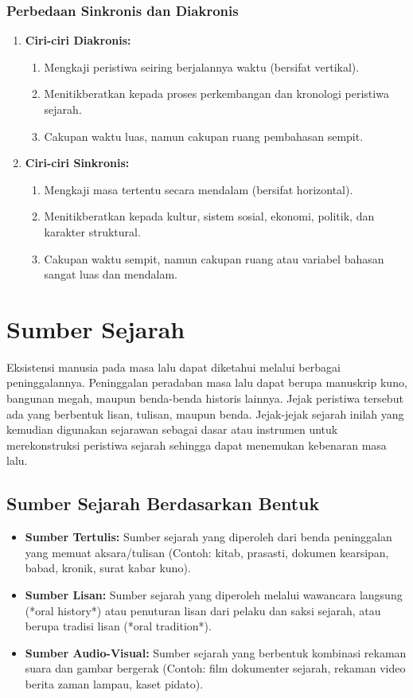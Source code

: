 \documentclass[12pt, a4paper]{article}
\begin{document}
\subsubsection{Perbedaan Sinkronis dan Diakronis} 
\begin{enumerate}
	\item \textbf{Ciri-ciri Diakronis:}
		\begin{enumerate}
			\item Mengkaji peristiwa seiring berjalannya waktu (bersifat vertikal).
			\item Menitikberatkan kepada proses perkembangan dan kronologi peristiwa sejarah.
			\item Cakupan waktu luas, namun cakupan ruang pembahasan sempit.
		\end{enumerate}
	\item \textbf{Ciri-ciri Sinkronis:}
		\begin{enumerate}
			\item Mengkaji masa tertentu secara mendalam (bersifat horizontal).
			\item Menitikberatkan kepada kultur, sistem sosial, ekonomi, politik, dan karakter struktural.
			\item Cakupan waktu sempit, namun cakupan ruang atau variabel bahasan sangat luas dan mendalam.
		\end{enumerate}
\end{enumerate}

\section{Sumber Sejarah}
Eksistensi manusia pada masa lalu dapat diketahui melalui berbagai peninggalannya. Peninggalan peradaban masa lalu dapat berupa manuskrip kuno, bangunan megah, maupun benda-benda historis lainnya. Jejak peristiwa tersebut ada yang berbentuk lisan, tulisan, maupun benda. Jejak-jejak sejarah inilah yang kemudian digunakan sejarawan sebagai dasar atau instrumen untuk merekonstruksi peristiwa sejarah sehingga dapat menemukan kebenaran masa lalu.

\subsection{Sumber Sejarah Berdasarkan Bentuk}
\begin{itemize}
	\item \textbf{Sumber Tertulis:} Sumber sejarah yang diperoleh dari benda peninggalan yang memuat aksara/tulisan (Contoh: kitab, prasasti, dokumen kearsipan, babad, kronik, surat kabar kuno).
	\item \textbf{Sumber Lisan:} Sumber sejarah yang diperoleh melalui wawancara langsung (*oral history*) atau penuturan lisan dari pelaku dan saksi sejarah, atau berupa tradisi lisan (*oral tradition*).
	\item \textbf{Sumber Audio-Visual:} Sumber sejarah yang berbentuk kombinasi rekaman suara dan gambar bergerak (Contoh: film dokumenter sejarah, rekaman video berita zaman lampau, kaset pidato).
\end{itemize}
\end{document}
